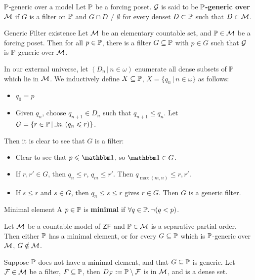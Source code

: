 \documentclass{article}
\begin{document}
\begin{fancydefine}{$\mathbb{P}$-generic over a model}
    Let $\mathbb{P}$ be a forcing poset. $\mathcal{G}$ is said to be $\mathbb{P}$\textbf{-generic over }$\mathcal{M}$ if $G$ is a filter on $\mathbb{P}$ and $G \cap D \neq \emptyset$ for every denset $D \subset \mathbb{P}$ such that $D \in \mathcal{M}$.
\end{fancydefine}
\begin{fancylem}{Generic Filter existence}
    Let $\mathcal{M}$ be an elementary countable set, and $\mathbb{P} \in \mathcal{M}$ be a forcing poset. Then for all $p \in \mathbb{P}$, there is a filter $G \subseteq \mathbb{P}$ with $p \in G$ such that $\mathcal{G}$ is $\mathbb{P}$-generic over $\mathcal{M}$.
\end{fancylem}
\proof In our external universe, let $(D_{n} \, | \, n \in \omega)$ enumerate all dense subsets of $\mathbb{P}$ which lie in $\mathcal{M}$. We inductively define $X \subseteq \mathbb{P}$, $X = \{q_{n} \, | \, n \in \omega\}$ as follows: \begin{itemize}
    \item $q_{0}=p$
    \item Given $q_{n}$, choose $q_{n+1} \in D_{n}$ such that $q_{n+1} \leq q_{n}$. Let $G = \{ r \in \mathbb{P} \, | \, \exists n. \, (q_{n} \leqslant r)\}$.
\end{itemize}
Then it is clear to see that $G$ is a filter:
\begin{itemize}
    \item Clear to see that $p \leq \bbone$, so $\bbone \in G$.
    \item If $r, r' \in G$, then $q_{n} \leq r$, $q_{m} \leq r'$. Then $q_{\max(m,n)} \leq r,r'$.
    \item If $s \leq r$ and $s \in G$, then $q_{n} \leq s \leq r$ gives $r \in G$. Then $G$ is a generic filter.
\end{itemize}
\newlec
\begin{fancydefine}{Minimal element}
    A $p \in \mathbb{P}$ is \textbf{minimal} if $\forall q \in \mathbb{P}. \, \neg(q<p)$.
\end{fancydefine}
\begin{fancylem}{}
    Let $\mathcal{M}$ be a countable model of $\mathsf{ZF}$ and $\mathbb{P} \in \mathcal{M}$ is a separative partial order. Then either $\mathbb{P}$ has a minimal element, or for every $G \subseteq \mathbb{P}$ which is $\mathbb{P}$-generic over $\mathcal{M}$, $G \notin \mathcal{M}$.
\end{fancylem}
\proof Suppose $\mathbb{P}$ does not have a minimal element, and that $G \subseteq \mathbb{P}$ is generic. Let $\mathcal{F} \in \mathcal{M}$ be a filter, $F \subseteq \mathbb{P}$, then $D_{\mathcal{F}} := \mathbb{P} \setminus \mathcal{F}$ is in $\mathcal{M}$, and is a dense set.\gap
\end{document}
